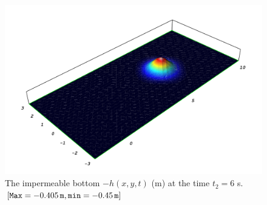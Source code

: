 \begin{figure}
\begin{center}
\includegraphics[width=\largefig]{chapters/lopes/pdf/depth6.pdf}
\end{center}
\caption{The impermeable bottom $-h(x,y,t)$ (m) at the time
  $t_2=6$ s. $[{\tt Max}= -0.405\, {\tt m}, {\tt
      min}=-0.45\,{\tt m}]$}
\label{fig:lopes:objectbottom2}
\end{figure}

